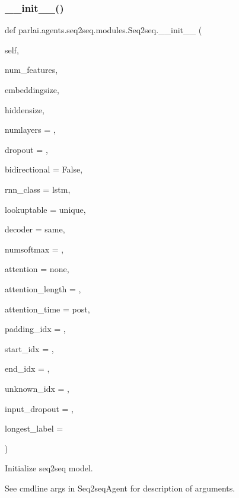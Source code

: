 \subsubsection{\texorpdfstring{\+\_\+\+\_\+init\+\_\+\+\_\+()}{\_\_init\_\_()}}
{\footnotesize\ttfamily def parlai.\+agents.\+seq2seq.\+modules.\+Seq2seq.\+\_\+\+\_\+init\+\_\+\+\_\+ (\begin{DoxyParamCaption}\item[{}]{self,  }\item[{}]{num\+\_\+features,  }\item[{}]{embeddingsize,  }\item[{}]{hiddensize,  }\item[{}]{numlayers = {},  }\item[{}]{dropout = {},  }\item[{}]{bidirectional = {\ttfamily False},  }\item[{}]{rnn\+\_\+class = {\ttfamily \textquotesingle{}lstm\textquotesingle{}},  }\item[{}]{lookuptable = {\ttfamily \textquotesingle{}unique\textquotesingle{}},  }\item[{}]{decoder = {\ttfamily \textquotesingle{}same\textquotesingle{}},  }\item[{}]{numsoftmax = {},  }\item[{}]{attention = {\ttfamily \textquotesingle{}none\textquotesingle{}},  }\item[{}]{attention\+\_\+length = {},  }\item[{}]{attention\+\_\+time = {\ttfamily \textquotesingle{}post\textquotesingle{}},  }\item[{}]{padding\+\_\+idx = {},  }\item[{}]{start\+\_\+idx = {},  }\item[{}]{end\+\_\+idx = {},  }\item[{}]{unknown\+\_\+idx = {},  }\item[{}]{input\+\_\+dropout = {},  }\item[{}]{longest\+\_\+label = {} }\end{DoxyParamCaption})}

\begin{DoxyVerb}Initialize seq2seq model.

See cmdline args in Seq2seqAgent for description of arguments.
\end{DoxyVerb}
 

